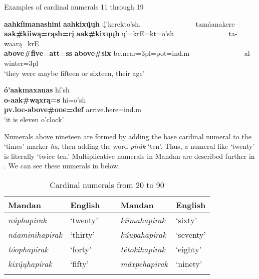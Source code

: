\begin{exe}

\item\label{MoreExamplesOfCardinalNumerals} Examples of cardinal numerals 11 through 19

\begin{xlist}

\item\label{MoreExamplesOfCardinalNumerals1} \glll \textbf{aahkíimanashini} \textbf{aahkixų́ųh} ų́'kerekto'sh, ~ ~ ~ ~ ~ ~ ~ ~ ~ tamáanakere\\
    \textbf{aak\#kiiwą=rąsh=rį} \textbf{aak\#kixųųh} ų'=krE=kt=o'sh ~ ~ ~ ~ ~ ~ ~ ~ ~ ta-waarą=krE\\
   \textbf{ \textnormal{\bfseries above}\#\textnormal{\bfseries five}=att=ss} \textbf{\textnormal{\bfseries above}\#\textnormal{\bfseries six}} \textnormal{be.near}=3pl=pot=ind.m ~ ~ ~ ~ ~ ~ ~ ~ ~ al-\textnormal{winter}=3pl\\
    \glt `they were maybe fifteen or sixteen, their age' \citep[41]{trechter2012}
    
\item\label{MoreExamplesOfCardinalNumerals2} \glll \textbf{ó'aakmaxanas} hí'sh\\
    \textbf{o-aak\#wąxrą=s} hi=o'sh\\
    \textbf{pv.loc-\textnormal{\bfseries above}\#\textnormal{\bfseries one}=def} \textnormal{arrive.here}=ind.m\\
    \glt `it is eleven o'clock' \citep[16]{kasak2014}

\end{xlist}

\end{exe}

Numerals above nineteen are formed by adding the base cardinal numeral to the `times' marker \textit{ha}, then adding the word \textit{pirák} `ten'. Thus, a numeral like `twenty' is literally `twice ten.' Multiplicative numerals in Mandan are described further in . We can see these numerals in  below.

\begin{table}
        \caption{Cardinal numerals from 20 to 90}\label{Tab20to90}
    \begin{tabular}{lllll}
\lsptoprule
    \textbf{Mandan}&\textbf{English}& ~&  \textbf{Mandan}&\textbf{English}\\
\midrule
    \textit{núphapirak}&`twenty'&~&                  
        \textit{kíimahapirak}&`sixty'\\
    \textit{náaminihapirak}&`thirty'&~&    
        \textit{kúupahapirak}&`seventy'\\
    \textit{tóophapirak}&`forty'&~&   
        \textit{tétokihapirak}&`eighty'\\
    \textit{kixų́ųhapirak}&`fifty'&~&
        \textit{máxpehapirak}&`ninety'\\\lspbottomrule
    \end{tabular}

\end{table}


